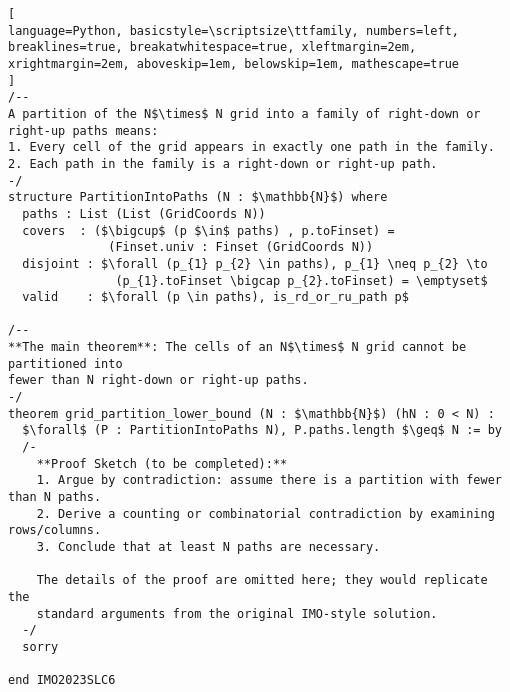 \begin{tcolorbox}
\begin{lstlisting}[
language=Python, basicstyle=\scriptsize\ttfamily, numbers=left, breaklines=true, breakatwhitespace=true, xleftmargin=2em, xrightmargin=2em, aboveskip=1em, belowskip=1em, mathescape=true
]
/--
A partition of the N$\times$ N grid into a family of right-down or right-up paths means:
1. Every cell of the grid appears in exactly one path in the family.
2. Each path in the family is a right-down or right-up path.
-/
structure PartitionIntoPaths (N : $\mathbb{N}$) where
  paths : List (List (GridCoords N))
  covers  : ($\bigcup$ (p $\in$ paths) , p.toFinset) = 
              (Finset.univ : Finset (GridCoords N))
  disjoint : $\forall (p_{1} p_{2} \in paths), p_{1} \neq p_{2} \to 
               (p_{1}.toFinset \bigcap p_{2}.toFinset) = \emptyset$
  valid    : $\forall (p \in paths), is_rd_or_ru_path p$

/--
**The main theorem**: The cells of an N$\times$ N grid cannot be partitioned into
fewer than N right-down or right-up paths.
-/
theorem grid_partition_lower_bound (N : $\mathbb{N}$) (hN : 0 < N) :
  $\forall$ (P : PartitionIntoPaths N), P.paths.length $\geq$ N := by
  /-
    **Proof Sketch (to be completed):**
    1. Argue by contradiction: assume there is a partition with fewer than N paths.
    2. Derive a counting or combinatorial contradiction by examining rows/columns.
    3. Conclude that at least N paths are necessary.

    The details of the proof are omitted here; they would replicate the
    standard arguments from the original IMO-style solution.
  -/
  sorry

end IMO2023SLC6
\end{lstlisting}
\end{tcolorbox}


